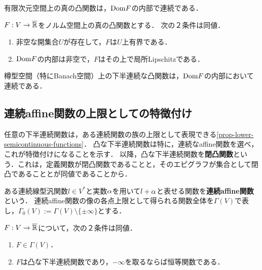 \documentclass[uplatex,dvipdfmx]{jsreport}
\begin{document}
\begin{corollary}[有限次元空間上の凸関数は連続]
    有限次元空間上の真の凸関数は，$\mathrm{Dom} F$の内部で連続である．
\end{corollary}

\begin{corollary}
    $F:V\to\overline{\mathbb{R}}$をノルム空間上の真の凸関数とする．
    次の２条件は同値．
    \begin{enumerate}
        \item 非空な開集合$U$が存在して，$F$は$U$上有界である．
        \item $\mathrm{Dom} F$の内部は非空で，$F$はその上で局所Lipschitzである．
    \end{enumerate}
\end{corollary}

\begin{corollary}
    樽型空間（特にBanach空間）上の下半連続な凸関数は，$\mathrm{Dom} F$の内部において連続である．
\end{corollary}

\subsection{連続affine関数の上限としての特徴付け}

\begin{tcolorbox}[colframe=ForestGreen, colback=ForestGreen!10!white,breakable,colbacktitle=ForestGreen!40!white,coltitle=black,fonttitle=\bfseries\sffamily,
title=閉凸関数への注目]
    任意の下半連続関数は，ある連続関数の族の上限として表現できる\ref{prop-lower-semicontinuous-functions}．
    凸な下半連続関数は特に，連続なaffine関数を選べ，これが特徴付けになることを示す．
    以降，凸な下半連続関数を\textbf{閉凸関数}という．これは，定義関数が閉凸関数であることと，そのエピグラフが集合として閉凸であることとが同値であることから．
\end{tcolorbox}

\begin{definition}
    ある連続線型汎関数$l\in V^*$と実数$\alpha$を用いて$l+\alpha$と表せる関数を\textbf{連続affine関数}という．
    連続affine関数の像の各点上限として得られる関数全体を$\Gamma(V)$で表し，$\Gamma_0(V):=\Gamma(V)\setminus\{\pm\infty\}$とする．
\end{definition}

\begin{proposition}
    $F:V\to\overline{\mathbb{R}}$について，次の２条件は同値．
    \begin{enumerate}
        \item $F\in\Gamma(V)$．
        \item $F$は凸な下半連続関数であり，$-\infty$を取るならば恒等関数である．
    \end{enumerate}
\end{proposition}
\end{document}
